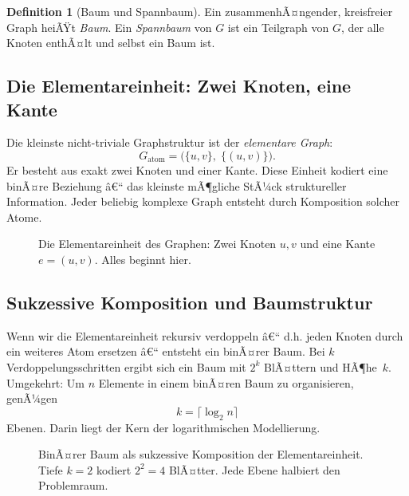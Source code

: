 ﻿\documentclass[12pt,a4paper,twoside]{article}
\theoremstyle{definition}
\newtheorem{definition}{Definition}[section]
\theoremstyle{plain}
\theoremstyle{remark}
\begin{document}
\begin{definition}[Baum und Spannbaum]
Ein zusammenhÃ¤ngender, kreisfreier Graph heiÃŸt \emph{Baum}.
Ein \emph{Spannbaum} von $G$ ist ein Teilgraph von $G$, der alle
Knoten enthÃ¤lt und selbst ein Baum ist.
\end{definition}

\subsection{Die Elementareinheit: Zwei Knoten, eine Kante}

Die kleinste nicht-triviale Graphstruktur ist der \emph{elementare
Graph}:
\[
  G_{\text{atom}} = \bigl(\{u, v\},\; \{(u,v)\}\bigr).
\]
Er besteht aus exakt zwei Knoten und einer Kante.  Diese Einheit
kodiert eine binÃ¤re Beziehung â€“ das kleinste mÃ¶gliche StÃ¼ck
struktureller Information.  Jeder beliebig komplexe Graph entsteht
durch Komposition solcher Atome.

\begin{figure}[h]
  \centering
  \caption{Die Elementareinheit des Graphen: Zwei Knoten $u, v$
           und eine Kante $e=(u,v)$.  Alles beginnt hier.}
  \label{fig:atom}
\end{figure}

\subsection{Sukzessive Komposition und Baumstruktur}

Wenn wir die Elementareinheit rekursiv verdoppeln â€“ d.h. jeden
Knoten durch ein weiteres Atom ersetzen â€“ entsteht ein binÃ¤rer
Baum.  Bei $k$ Verdoppelungsschritten ergibt sich ein Baum mit
$2^k$ BlÃ¤ttern und HÃ¶he~$k$.  Umgekehrt:  Um $n$ Elemente in
einem binÃ¤ren Baum zu organisieren, genÃ¼gen
\[
  k = \lceil \log_2 n \rceil
\]
Ebenen.  Darin liegt der Kern der logarithmischen Modellierung.

\begin{figure}[h]
  \centering
  \caption{BinÃ¤rer Baum als sukzessive Komposition der
           Elementareinheit.  Tiefe $k=2$ kodiert $2^2=4$ BlÃ¤tter.
           Jede Ebene halbiert den Problemraum.}
  \label{fig:binaer}
\end{figure}
\end{document}
